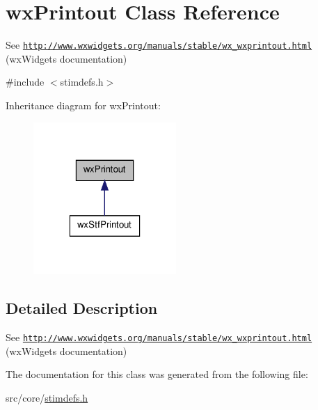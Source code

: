 \hypertarget{classwxPrintout}{
\section{wxPrintout Class Reference}
\label{classwxPrintout}
}


See \href{http://www.wxwidgets.org/manuals/stable/wx_wxprintout.html}{\tt http://www.wxwidgets.org/manuals/stable/wx\_\-wxprintout.html} (wxWidgets documentation)  




{\ttfamily \#include $<$stimdefs.h$>$}



Inheritance diagram for wxPrintout:
\nopagebreak
\begin{figure}[H]
\begin{center}
\leavevmode
\includegraphics[width=154pt]{classwxPrintout__inherit__graph}
\end{center}
\end{figure}


\subsection{Detailed Description}
See \href{http://www.wxwidgets.org/manuals/stable/wx_wxprintout.html}{\tt http://www.wxwidgets.org/manuals/stable/wx\_\-wxprintout.html} (wxWidgets documentation) 

The documentation for this class was generated from the following file:\begin{DoxyCompactItemize}
\item 
src/core/\hyperlink{stimdefs_8h}{stimdefs.h}\end{DoxyCompactItemize}
